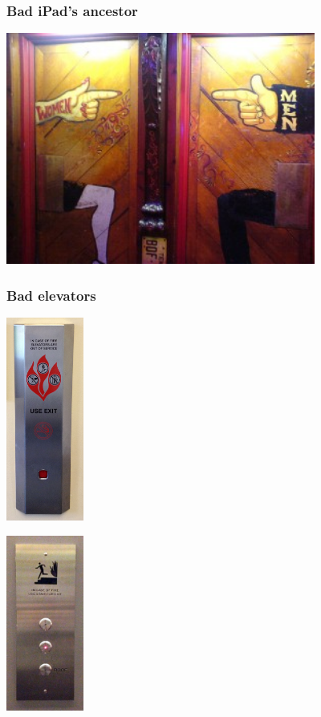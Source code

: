 \hypertarget{bad-ipads-ancestor}{%
\subsubsection{Bad iPad's ancestor}\label{bad-ipads-ancestor}}

\begin{center}
  \includegraphics[width=4.0in]{fiDarkHorse.jpg}
\end{center}

\hypertarget{bad-elevators}{%
\subsubsection{Bad elevators}\label{bad-elevators}}

\begin{center}
  \includegraphics[width=1.0in]{fiElev1.jpg}
\end{center}

\begin{center}
  \includegraphics[width=1.0in]{fiElev2.jpg}
\end{center}

